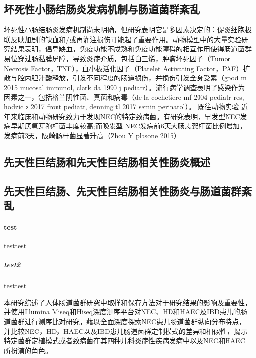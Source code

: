 \subsection{坏死性小肠结肠炎发病机制与肠道菌群紊乱}
坏死性小肠结肠炎发病机制尚未明确，但研究表明它是多因素决定的：促炎细胞极联反映加剧的缺血和/或再灌注损伤可能起了重要作用。动物模型中的大量实验研究结果表明，倡导缺血，免疫功能不成熟和免疫功能障碍的相互作用使得肠道菌群易位穿过肠黏膜屏障，导致炎症介质，包括白三烯，肿瘤坏死因子（Tumor Necrosis Factor，TNF），血小板活化因子（Platelet Activating Factor，PAF）扩散与腔内胆汁酸释放，引发不同程度的肠道损伤，并损伤引发全身受累（good m 2015 mucosal immunol, clark da 1990 j pediatr）。流行病学调查表明了感染作为因素之一，包括格兰阴性菌、真菌和病毒（de la cochetiere mf 2004 pediatr res, hodzic z 2017 front pediatr, denning tl 2017 semin perinatol）。
既往动物实验
近年来临床和动物研究致力于发现NEC的特定致病菌。有研究表明，早发型NEC发病早期厌氧芽孢杆菌丰度较高;而晚发型 NEC发病前6天大肠志贺杆菌比例增加，发病前3天，阪崎肠杆菌显著升高（Zhou Y plosone 2015）

\subsection{先天性巨结肠和先天性巨结肠相关性肠炎概述}
\subsection{先天性巨结肠、先天性巨结肠相关性肠炎与肠道菌群紊乱}
\paragraph{test}
testtest
\subparagraph{test2}
testtest


本研究综述了人体肠道菌群研究中取样和保存方法对于研究结果的影响及重要性，并使用Illumina Miseq和Hiseq深度测序平台对NEC、HD和HAEC及IBD患儿的肠道菌群进行测序比对研究，藉以全面深度探索NEC患儿肠道菌群纵向分布特点，并比较NEC，HD，HAEC以及IBD患儿肠道菌群定制模式的差异和相似性，揭示特定菌群定植模式或者致病菌在其四种儿科炎症性疾病发病中以及NEC和HAEC所扮演的角色。
